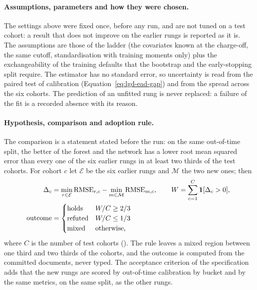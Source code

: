 \paragraph{Assumptions, parameters and how they were chosen.} The settings above were fixed once, before any run, and are not tuned on a test cohort: a result that does not improve on the earlier rungs is reported as it is. The assumptions are those of the ladder (the covariates known at the charge-off, the same cutoff, standardisation with training moments only) plus the exchangeability of the training defaults that the bootstrap and the early-stopping split require. The estimator has no standard error, so uncertainty is read from the paired test of calibration (Equation~\eqref{eq:lgd-ead-gap}) and from the spread across the six cohorts. The prediction of an unfitted rung is never replaced: a failure of the fit is a recorded absence with its reason.

\paragraph{Hypothesis, comparison and adoption rule.} The comparison is a statement stated before the run: on the same out-of-time split, the better of the forest and the network has a lower root mean squared error than every one of the six earlier rungs in at least two thirds of the test cohorts. For cohort $c$ let $\mathcal E$ be the six earlier rungs and $\mathcal M$ the two new ones; then
\begin{align}
\Delta_c&=\min_{r\in\mathcal E}\mathrm{RMSE}_{r,c}-\min_{m\in\mathcal M}\mathrm{RMSE}_{m,c},\qquad W=\sum_{c=1}^{C}\mathbf 1[\Delta_c>0],\label{eq:lgd-ead-adoption}\\
\text{outcome}&=\begin{cases}\text{holds}&W/C\ge 2/3\\ \text{refuted}&W/C\le 1/3\\ \text{mixed}&\text{otherwise,}\end{cases}\notag
\end{align}
where $C$ is the number of test cohorts (). The rule leaves a mixed region between one third and two thirds of the cohorts, and the outcome is computed from the committed documents, never typed. The acceptance criterion of the specification adds that the new rungs are scored by out-of-time calibration by bucket and by the same metrics, on the same split, as the other rungs.

